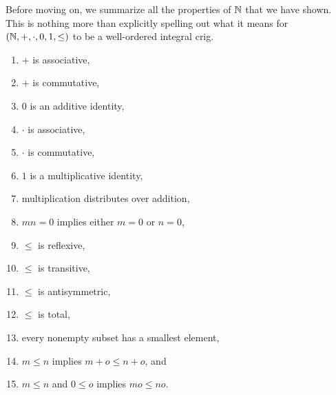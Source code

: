 Before moving on, we summarize all the properties of $\mathbb{N}$ that we have shown.  This is nothing more than explicitly spelling out what it means for $(\mathbb{N} ,+,\cdot ,0,1,\leq )$ to be a well-ordered integral crig.
\begin{enumerate}
\item $+$ is associative,
\item $+$ is commutative,
\item $0$ is an additive identity,
\item $\cdot$ is associative,
\item $\cdot$ is commutative,
\item $1$ is a multiplicative identity,
\item multiplication distributes over addition,
\item $mn=0$ implies either $m=0$ or $n=0$,
\item $\leq$ is reflexive,
\item $\leq$ is transitive,
\item $\leq$ is antisymmetric,
\item $\leq$ is total,
\item every nonempty subset has a smallest element,
\item $m\leq n$ implies $m+o\leq n+o$, and
\item $m\leq n$ and $0\leq o$ implies $mo\leq no$.
\end{enumerate}

